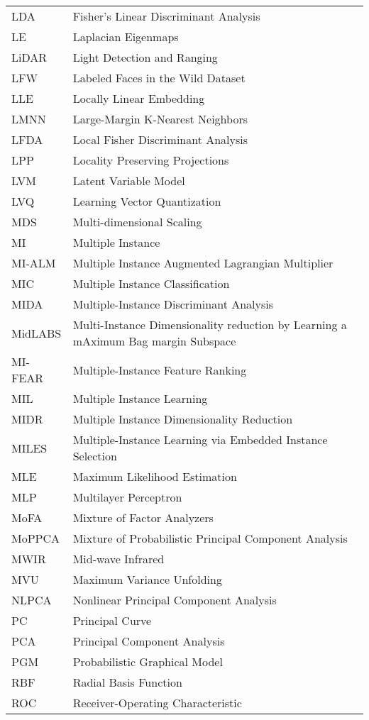 \begin{longtable}{l p{5in}}
LDA & Fisher's Linear Discriminant Analysis\\
LE & Laplacian Eigenmaps\\
LiDAR & Light Detection and Ranging\\
LFW & Labeled Faces in the Wild Dataset\\
LLE & Locally Linear Embedding\\
LMNN & Large-Margin K-Nearest Neighbors\\
LFDA & Local Fisher Discriminant Analysis\\
LPP & Locality Preserving Projections\\
LVM & Latent Variable Model\\
LVQ & Learning Vector Quantization\\
MDS & Multi-dimensional Scaling\\
MI & Multiple Instance\\
MI-ALM & Multiple Instance Augmented Lagrangian Multiplier\\
MIC & Multiple Instance Classification\\
MIDA & Multiple-Instance Discriminant Analysis\\
MidLABS & Multi-Instance Dimensionality reduction by Learning a mAximum Bag margin Subspace\\
MI-FEAR & Multiple-Instance Feature Ranking\\
MIL & Multiple Instance Learning\\
MIDR & Multiple Instance Dimensionality Reduction\\
MILES & Multiple-Instance Learning via Embedded Instance Selection\\
MLE & Maximum Likelihood Estimation\\
MLP & Multilayer Perceptron\\
MoFA & Mixture of Factor Analyzers\\
MoPPCA & Mixture of Probabilistic Principal Component Analysis\\
MWIR & Mid-wave Infrared\\
MVU & Maximum Variance Unfolding\\
NLPCA & Nonlinear Principal Component Analysis\\
PC & Principal Curve\\
PCA & Principal Component Analysis\\
PGM & Probabilistic Graphical Model\\
RBF & Radial Basis Function\\
ROC & Receiver-Operating Characteristic\\

\end{longtable}
